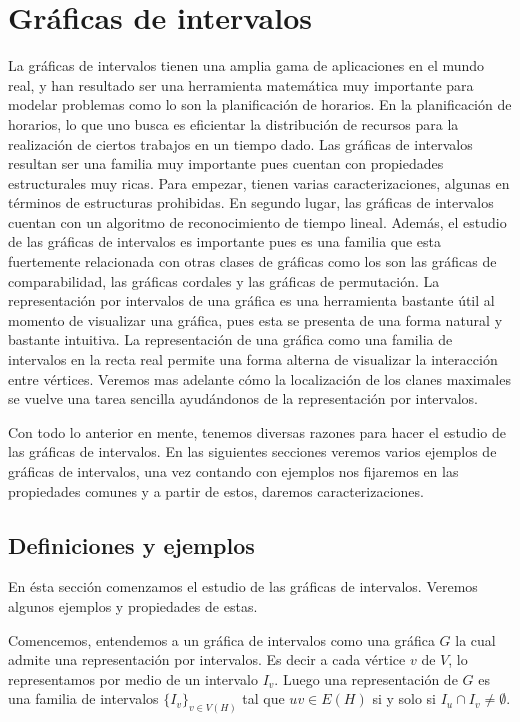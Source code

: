 \chapter{Gráficas de intervalos}
\label{cap:GrafInt}



La gráficas de intervalos tienen una amplia gama de aplicaciones en el mundo
real, y han resultado ser una herramienta matemática muy importante para modelar
problemas como lo son la planificación de horarios. En la planificación de
horarios, lo que uno busca es eficientar la distribución de recursos para la
realización de ciertos trabajos en un tiempo dado. Las gráficas de intervalos
resultan ser una familia muy importante pues cuentan con propiedades
estructurales muy ricas. Para empezar, tienen varias caracterizaciones, algunas
en términos de estructuras prohibidas. En segundo lugar, las gráficas de
intervalos cuentan con un algoritmo de reconocimiento de tiempo lineal. Además,
el estudio de las gráficas de intervalos es importante pues es una familia que
esta fuertemente relacionada con otras clases de gráficas como los son las
gráficas de comparabilidad, las gráficas cordales y las gráficas de permutación.
La representación por intervalos de una gráfica es una herramienta bastante útil
al momento de visualizar una gráfica, pues esta  se presenta de una forma
natural y bastante intuitiva. La representación de una gráfica como una familia
de intervalos en la recta real permite una forma alterna de visualizar la
interacción entre vértices. Veremos mas adelante c\'omo la localización de los
clanes maximales se vuelve una tarea sencilla ayudándonos de la representación
por intervalos.

Con todo lo anterior en mente, tenemos diversas razones para hacer el estudio de
las gráficas de intervalos. En las siguientes secciones veremos varios ejemplos
de gráficas de intervalos, una vez contando con ejemplos nos fijaremos en las
propiedades comunes y a partir de estos, daremos caracterizaciones.

\section{Definiciones y ejemplos}
En ésta sección comenzamos el estudio  de las gráficas de intervalos. Veremos
algunos ejemplos y propiedades de estas.

Comencemos, entendemos a un gráfica de intervalos como una gráfica $G$ la cual
admite una representación por intervalos. Es decir a cada vértice $v$ de $V$, lo
representamos por medio de un intervalo $I_v$. Luego una representación de $G$
es una familia de intervalos $\{ I_v \}_{v\in V(H)}$ tal que $uv\in E(H)$ si y
solo si $I_u \cap I_v \neq \emptyset$.

